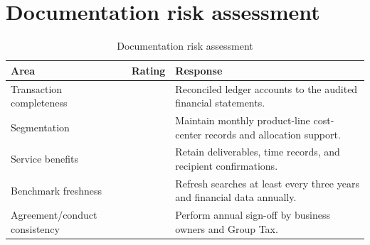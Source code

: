 \section{Documentation risk assessment}
\begin{table}[htbp]
  \centering
  \caption{Documentation risk assessment}
  \begin{tabularx}{\textwidth}{@{}P{42mm}C Y@{}}
    \toprule
    \textbf{Area} & \textbf{Rating} & \textbf{Response}\\
    \midrule
    Transaction completeness &  & Reconciled ledger accounts to the audited financial statements.\\
    Segmentation &  & Maintain monthly product-line cost-center records and allocation support.\\
    Service benefits &  & Retain deliverables, time records, and recipient confirmations.\\
    Benchmark freshness &  & Refresh searches at least every three years and financial data annually.\\
    Agreement/conduct consistency &  & Perform annual sign-off by business owners and Group Tax.\\
    \bottomrule
  \end{tabularx}
\end{table}

